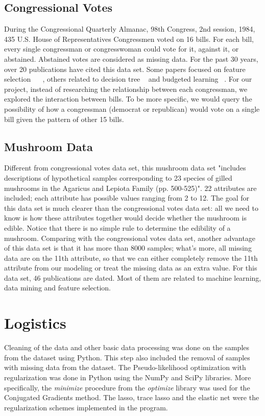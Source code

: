 \documentclass[11pt]{article}
\begin{document}
\subsection{Congressional Votes}

During the Congressional Quarterly Almanac, 98th Congress, 2nd session, 1984, 435 U.S. House of Representatives Congressmen voted on 16 bills. For each bill, every single congressman or congresswoman could vote for it, against it, or abstained. Abstained votes are considered as missing data. For the past 30 years, over 20 publications have cited this data set. Some papers focused on feature selection ~\cite{Chun1999ANNigma} ~\cite{Huan1998Inc}, others related to decision tree ~\cite{Erin1995Fea} and budgeted learning ~\cite{Dan2012Bud}. For our project, instead of researching the relationship between each congressman, we explored the interaction between bills. To be more specific, we would query the possibility of how a congressman (democrat or republican) would vote on a single bill given the pattern of other 15 bills.

\subsection{Mushroom Data}

Different from congressional votes data set, this mushroom data set "includes descriptions of hypothetical samples corresponding to 23 species of gilled mushrooms in the Agaricus and Lepiota Family (pp. 500-525)". 22 attributes are included; each attribute has possible values ranging from 2 to 12. The goal for this data set is much clearer than the congressional votes data set: all we need to know is how these attributes together would decide whether the mushroom is edible. Notice that there is no simple rule to determine the edibility of a mushroom. Comparing with the congressional votes data set, another advantage of this data set is that it has more than 8000 samples; what's more, all missing data are on the 11th attribute, so that we can either completely remove the 11th attribute from our modeling or treat the missing data as an extra value. For this data set, 46 publications are dated. Most of them are related to machine learning, data mining and feature selection.

\section{Logistics}

Cleaning of the data and other basic data processing was done on the samples from the dataset using Python. This step also included the removal of samples with missing data from the dataset. 
The Pseudo-likelihood optimization with regularization was done in Python using the NumPy and SciPy libraries. 
More specifically, the \textit{minimize} procedure from the \textit{optimize} library was used for the Conjugated Gradients method. 
The lasso, trace lasso and the elastic net were the regularization schemes implemented in the program.
\end{document}
